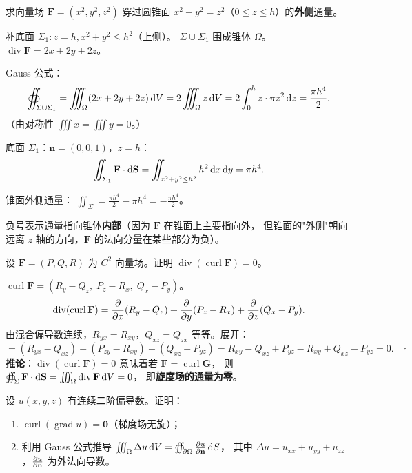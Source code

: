\documentclass{article}
\DeclareMathOperator{\curl}{curl}
\DeclareMathOperator{\divergence}{div}
\DeclareMathOperator{\grad}{grad}
\begin{document}
\begin{exercise}[综合——通量与散度]
  求向量场 $\mathbf{F} = (x^2, y^2, z^2)$ 穿过圆锥面
  $x^2+y^2=z^2$（$0 \le z \le h$）的\textbf{外侧}通量。
\end{exercise}

\begin{solution}
  补底面 $\Sigma_1: z=h, x^2+y^2\le h^2$（上侧）。
  $\Sigma\cup\Sigma_1$ 围成锥体 $\Omega$。
  $\divergence\mathbf{F} = 2x+2y+2z$。

  Gauss 公式：
  \[
    \oiint_{\Sigma\cup\Sigma_1} = \iiint_\Omega (2x+2y+2z) \,\mathrm{d} V
    = 2\iiint_\Omega z \,\mathrm{d} V
    = 2\int_0^h z\cdot\pi z^2 \,\mathrm{d} z = \frac{\pi h^4}{2}.
  \]
  （由对称性 $\iiint x = \iiint y = 0$。）

  底面 $\Sigma_1$：$\mathbf{n}=(0,0,1)$，$z=h$：
  \[
    \iint_{\Sigma_1} \mathbf{F}\cdot\mathrm{d}\mathbf{S}
    = \iint_{x^2+y^2\le h^2} h^2 \,\mathrm{d} x\,\mathrm{d} y = \pi h^4.
  \]

  锥面外侧通量：
  $\iint_\Sigma = \frac{\pi h^4}{2} - \pi h^4 = -\frac{\pi h^4}{2}$。

  负号表示通量指向锥体\textbf{内部}（因为 $\mathbf{F}$ 在锥面上主要指向外，
  但锥面的"外侧"朝向远离 $z$ 轴的方向，$\mathbf{F}$ 的法向分量在某些部分为负）。
\end{solution}

\begin{exercise}[证明题——$\divergence(\curl\mathbf{F})=0$]
  设 $\mathbf{F} = (P, Q, R)$ 为 $C^2$ 向量场。证明 $\divergence(\curl\mathbf{F}) = 0$。
\end{exercise}

\begin{solution}
  $\curl\mathbf{F} = (R_y-Q_z,\; P_z-R_x,\; Q_x-P_y)$。
  \[
    \divergence(\curl\mathbf{F})
    = \pdfFrac{}{x}(R_y-Q_z) + \pdfFrac{}{y}(P_z-R_x) + \pdfFrac{}{z}(Q_x-P_y).
  \]
  由混合偏导数连续，$R_{yx} = R_{xy}$，$Q_{xz} = Q_{zx}$ 等等。展开：
  \[
    = (R_{yx} - Q_{xz}) + (P_{zy} - R_{xy}) + (Q_{xz} - P_{yz})
    = R_{xy} - Q_{xz} + P_{yz} - R_{xy} + Q_{xz} - P_{yz} = 0. \quad\square
  \]
  \textbf{推论}：$\divergence(\curl\mathbf{F})=0$ 意味着若 $\mathbf{F} =
  \curl\mathbf{G}$，
  则 $\oiint_\Sigma \mathbf{F}\cdot\dif\mathbf{S} = \iiint_\Omega
  \divergence\mathbf{F}\,\dif V = 0$，
  即\textbf{旋度场的通量为零}。
\end{solution}

\begin{exercise}[综合——梯度场性质]
  设 $u(x,y,z)$ 有连续二阶偏导数。证明：
  \begin{enumerate}
    \item $\curl(\grad u) = \mathbf{0}$（梯度场无旋）；
    \item 利用 Gauss 公式推导 $\iiint_\Omega \Delta u \,\mathrm{d} V =
      \oiint_{\partial\Omega} \frac{\partial u}{\partial \mathbf{n}} \,\mathrm{d} S$，
      其中 $\Delta u = u_{xx}+u_{yy}+u_{zz}$，$\frac{\partial u}{\partial \mathbf{n}}$ 为外法向导数。
  \end{enumerate}
\end{exercise}
\end{document}
